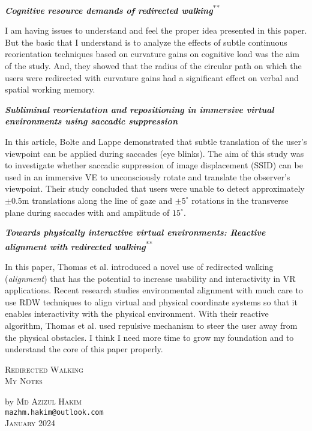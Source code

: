 \documentclass[12pt]{article}
\makeatletter
\newcommand\topPageBottom{
\noindent \hrulefill by {\scshape Md Azizul Hakim}\noindent \hrulefill \\
\normalsize
\texttt{mazhm.hakim@outlook.com} \\
\vspace{2.0em}
{\scshape January 2024}
}
\makeatother
\begin{document}
\noindent
\textbf{\cite{bruder2015cognitive} \emph{Cognitive resource demands of redirected walking}}\textsuperscript{**}

I am having issues to understand and feel the proper idea presented in this paper. But the basic that I understand is to analyze the effects of subtle continuous reorientation techniques based on curvature gains on cognitive load was the aim of the study. And, they showed that the radius of the circular path on which the users were redirected with curvature gains had a significant effect on verbal and spatial working memory.

\noindent
\textbf{\cite{bolte2015subliminal} \emph{Subliminal reorientation and repositioning in immersive virtual environments using saccadic suppression}}

In this article, Bolte and Lappe demonstrated that subtle translation of the user's viewpoint can be applied during saccades (eye blinks). The aim of this study was to investigate whether saccadic suppression of image displacement (SSID) can be used in an immersive VE to unconsciously rotate and translate the observer's viewpoint. Their study concluded that users were unable to detect approximately $\pm 0.5$m translations along the line of gaze and $\pm 5^{\circ}$ rotations in the transverse plane during saccades with and amplitude of $15^{\circ}$.

\noindent
\textbf{\cite{thomas2020towards} \emph{Towards physically interactive virtual environments: Reactive alignment with redirected walking}}\textsuperscript{**}

In this paper, Thomas et al. introduced a novel use of redirected walking (\emph{alignment}) that has the potential to increase usability and interactivity in VR applications. Recent research studies environmental alignment with much care to use RDW techniques to align virtual and physical coordinate systems so that it enables interactivity with the physical environment. With their reactive algorithm, Thomas et al. used repulsive mechanism to steer the user away from the physical obstacles. I think I need more time to grow my foundation and to understand the core of this paper properly.

\newpage

\begin{center}
\Huge
{\scshape Redirected Walking} \\
\LARGE
{\scshape My Notes} \\
\large
\topPageBottom
\end{center}
\end{document}
